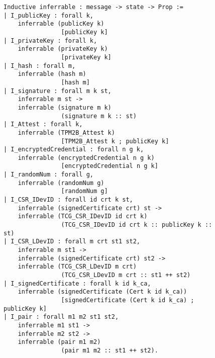 \begin{figure}[h]
\begin{lstlisting}[language=Coq]
Inductive inferrable : message -> state -> Prop :=
| I_publicKey : forall k,
    inferrable (publicKey k)
                [publicKey k]
| I_privateKey : forall k,
    inferrable (privateKey k)
                [privateKey k]
| I_hash : forall m,
    inferrable (hash m)
                [hash m]
| I_signature : forall m k st,
    inferrable m st ->
    inferrable (signature m k)
                (signature m k :: st)
| I_Attest : forall k,
    inferrable (TPM2B_Attest k)
                [TPM2B_Attest k ; publicKey k]
| I_encryptedCredential : forall n g k,
    inferrable (encryptedCredential n g k)
                [encryptedCredential n g k]
| I_randomNum : forall g,
    inferrable (randomNum g)
                [randomNum g]
| I_CSR_IDevID : forall id crt k st,
    inferrable (signedCertificate crt) st ->
    inferrable (TCG_CSR_IDevID id crt k)
                (TCG_CSR_IDevID id crt k :: publicKey k :: st)
| I_CSR_LDevID : forall m crt st1 st2,
    inferrable m st1 ->
    inferrable (signedCertificate crt) st2 ->
    inferrable (TCG_CSR_LDevID m crt) 
                (TCG_CSR_LDevID m crt :: st1 ++ st2)
| I_signedCertificate : forall k id k_ca,
    inferrable (signedCertificate (Cert k id k_ca)) 
                [signedCertificate (Cert k id k_ca) ; publicKey k]
| I_pair : forall m1 m2 st1 st2,
    inferrable m1 st1 ->
    inferrable m2 st2 -> 
    inferrable (pair m1 m2) 
                (pair m1 m2 :: st1 ++ st2).
\end{lstlisting}
\end{figure}

